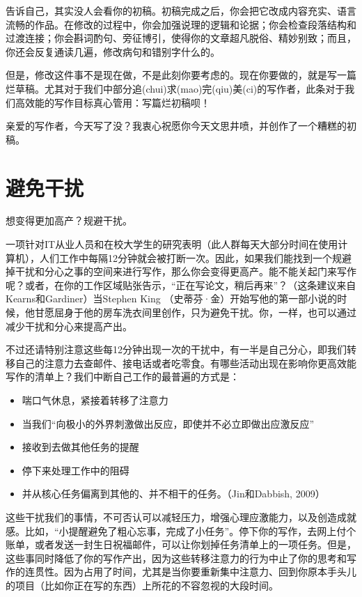 \documentclass[12pt]{ctexart}
\begin{document}
告诉自己，其实没人会看你的初稿。初稿完成之后，你会把它改成内容充实、语言流畅的作品。在修改的过程中，你会加强说理的逻辑和论据；你会检查段落结构和过渡连接；你会斟词酌句、旁征博引，使得你的文章超凡脱俗、精妙别致；而且，你还会反复通读几遍，修改病句和错别字什么的。

但是，修改这件事不是现在做，不是此刻你要考虑的。现在你要做的，就是写一篇烂草稿。尤其对于我们中部分追(chui)求(mao)完(qiu)美(ci)的写作者，此条对于我们高效能的写作目标真心管用：写篇烂初稿呗！

亲爱的写作者，今天写了没？我衷心祝愿你今天文思井喷，并创作了一个糟糕的初稿。

\section{避免干扰}
想变得更加高产？规避干扰。

一项针对IT从业人员和在校大学生的研究表明（此人群每天大部分时间在使用计算机），人们工作中每隔12分钟就会被打断一次。因此，如果我们能找到一个规避掉干扰和分心之事的空间来进行写作，那么你会变得更高产。能不能关起门来写作呢？或者，在你的工作区域贴张告示，“正在写论文，稍后再来”？（这条建议来自Kearns和Gardiner）当Stephen King （史蒂芬·金）开始写他的第一部小说的时候，他甘愿屈身于他的房车洗衣间里创作，只为避免干扰。你，一样，也可以通过减少干扰和分心来提高产出。

不过还请特别注意这些每12分钟出现一次的干扰中，有一半是自己分心，即我们转移自己的注意力去查邮件、接电话或者吃零食。有哪些活动出现在影响你更高效能写作的清单上？我们中断自己工作的最普遍的方式是：

\begin{itemize}
\item 喘口气休息，紧接着转移了注意力
\item 当我们“向极小的外界刺激做出反应，即使并不必立即做出应激反应”
\item 接收到去做其他任务的提醒
\item 停下来处理工作中的阻碍
\item 并从核心任务偏离到其他的、并不相干的任务。（Jin和Dabbish, 2009）
\end{itemize}

这些干扰我们的事情，不可否认可以减轻压力，增强心理应激能力，以及创造成就感。比如，“小提醒避免了粗心忘事，完成了小任务”。停下你的写作，去网上付个账单，或者发送一封生日祝福邮件，可以让你划掉任务清单上的一项任务。但是，这些事同时降低了你的写作产出，因为这些转移注意力的行为中止了你的思考和写作的连贯性。因为占用了时间，尤其是当你要重新集中注意力、回到你原本手头儿的项目（比如你正在写的东西）上所花的不容忽视的大段时间。
\end{document}
